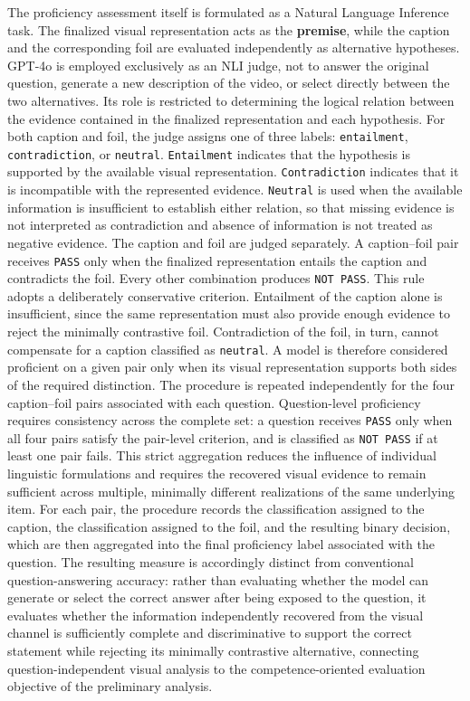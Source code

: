 The proficiency assessment itself is formulated as a Natural Language Inference task. The finalized visual representation acts as the \textbf{premise}, while the caption and the corresponding foil are evaluated independently as alternative hypotheses. GPT-4o is employed exclusively as an NLI judge, not to answer the original question, generate a new description of the video, or select directly between the two alternatives. Its role is restricted to determining the logical relation between the evidence contained in the finalized representation and each hypothesis.
For both caption and foil, the judge assigns one of three labels: \texttt{entailment}, \texttt{contradiction}, or \texttt{neutral}. \texttt{Entailment} indicates that the hypothesis is supported by the available visual representation. \texttt{Contradiction} indicates that it is incompatible with the represented evidence. \texttt{Neutral} is used when the available information is insufficient to establish either relation, so that missing evidence is not interpreted as contradiction and absence of information is not treated as negative evidence.
The caption and foil are judged separately. A caption--foil pair receives \texttt{PASS} only when the finalized representation entails the caption and contradicts the foil. Every other combination produces \texttt{NOT PASS}.
This rule adopts a deliberately conservative criterion. Entailment of the caption alone is insufficient, since the same representation must also provide enough evidence to reject the minimally contrastive foil. Contradiction of the foil, in turn, cannot compensate for a caption classified as \texttt{neutral}. A model is therefore considered proficient on a given pair only when its visual representation supports both sides of the required distinction.
The procedure is repeated independently for the four caption--foil pairs associated with each question. Question-level proficiency requires consistency across the complete set: a question receives \texttt{PASS} only when all four pairs satisfy the pair-level criterion, and is classified as \texttt{NOT PASS} if at least one pair fails. This strict aggregation reduces the influence of individual linguistic formulations and requires the recovered visual evidence to remain sufficient across multiple, minimally different realizations of the same underlying item.
For each pair, the procedure records the classification assigned to the caption, the classification assigned to the foil, and the resulting binary decision, which are then aggregated into the final proficiency label associated with the question. The resulting measure is accordingly distinct from conventional question-answering accuracy: rather than evaluating whether the model can generate or select the correct answer after being exposed to the question, it evaluates whether the information independently recovered from the visual channel is sufficiently complete and discriminative to support the correct statement while rejecting its minimally contrastive alternative, connecting question-independent visual analysis to the competence-oriented evaluation objective of the preliminary analysis.
